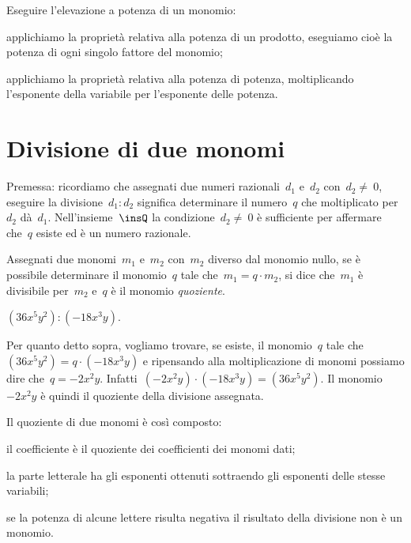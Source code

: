 \begin{procedura}
Eseguire l'elevazione a potenza di un monomio:

\begin{enumeratea}
 \item applichiamo la proprietà relativa alla potenza di un prodotto,
eseguiamo cioè la potenza di ogni singolo fattore del monomio;
 \item applichiamo la proprietà relativa alla potenza di potenza,
moltiplicando l'esponente della variabile per l'esponente delle potenza.
\end{enumeratea}
\end{procedura}

\ovalbox{\risolvii \ref{ese:9.17}, \ref{ese:9.18}, \ref{ese:9.19}, \ref{ese:9.20}}

\section{Divisione di due monomi}

Premessa: ricordiamo che assegnati due numeri razionali~$d_{1}$
e~$d_{2}$ con~$d_{2}\neq~0$, eseguire la
divisione~$d_{1}:d_{2}$ significa determinare il numero~$q$
che moltiplicato per~$d_{2}$ dà~$d_{1}$.
Nell'insieme~$\insQ$ la condizione~$d_{2}\neq~0$ è sufficiente per
affermare che~$q$ esiste ed è un numero razionale.

\begin{definizione}
Assegnati due monomi~$m_{1}$ e~$m_{2}$ con~$m_{2}$ diverso dal monomio nullo, se
è possibile determinare il monomio~$q$ tale che~$m_{1} = q\cdot m_{2}$, si dice che~$m_{1}$ è
divisibile per~$m_{2}$ e~$q$ è il monomio \emph{quoziente}.
\end{definizione}

\begin{exrig}
 \begin{esempio}
$(36x^{5}y^{2}):(-18x^{3}y)$.

Per quanto detto sopra, vogliamo trovare, se esiste, il monomio~$q$ tale
che~$(36x^{5}y^{2})=q\cdot (-18x^{3}y)$
e ripensando alla moltiplicazione di monomi possiamo dire
che~$q=-2x^{2}y$. Infatti~$(-2x^{2}y)\cdot(-18x^{3}y)=(36x^{5}y^{2})$. Il monomio~$-2x^{2}y$
è quindi il quoziente della divisione assegnata.
 \end{esempio}
\end{exrig}

\begin{procedura}
Il quoziente di due monomi è così composto:

\begin{enumeratea}
 \item il coefficiente è il quoziente dei coefficienti dei monomi dati;
 \item la parte letterale ha gli esponenti ottenuti sottraendo gli esponenti
delle stesse variabili;
 \item se la potenza di alcune lettere risulta negativa il risultato della
divisione non è un monomio.
\end{enumeratea}
\end{procedura}

